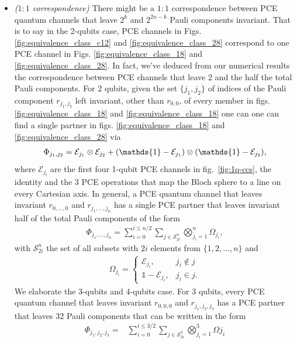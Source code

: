 \documentclass[11pt,dvipsnames]{article} %
\newcommand{\fref}[1]{fig.~\ref{#1}}
\newcommand{\E}{\mathcal{E}}
\newcommand{\1}{\mathds{1}}
\newcommand{\ot}{\otimes}
\begin{document}
\begin{itemize}
\item \textit{($1:1$ correspondence)} There might be a 
$1:1$ correspondence between PCE quantum channels
that leave $2^k$ and $2^{2n-k}$ Pauli components invariant. 
That is to say in the 2-qubits case, 
PCE channels in Figs. \ref{fig:equivalence_class_c12}
and \ref{fig:equivalence_class_28} correspond to one 
PCE channel in Figs. \ref{fig:equivalence_class_18} and
\ref{fig:equivalence_class_28}. In fact, we've deduced from 
our numerical results the correspondence between PCE channels 
that leave 2 and the half the total Pauli components. For 2 qubits,
given the set $\{j_1,j_2 \}$ of indices of the Pauli component $r_{j_1,j_2}$ left
invariant, other than $r_{0,0}$, of every member in figs.
\ref{fig:equivalence_class_18} and \ref{fig:equivalence_class_18} one 
can one can find a single partner in figs. \ref{fig:equivalence_class_18} and
\ref{fig:equivalence_class_28} via
\begin{align}
\Phi_{j_1,j_2}=\E_{j_1}\ot\E_{j_2}+\qty(\1-\E_{j_1})\ot\qty(\1-\E_{j_2}),
\end{align}
where $\E_{j_l}$ are the first four 1-qubit PCE channels in 
\fref{fig:1q-ccs}, the identity and the 3 PCE operations that 
map the Bloch sphere to a line on every Cartesian axis. In general, 
a PCE quantum channel that leaves invariant $r_{0,\ldots,0}$ and 
$r_{j_1,\ldots,j_n}$ has a single PCE partner that leaves invariant 
half of the total Pauli components of the form 
\begin{align}
\Phi_{j_1,\ldots,j_n}=\sum_{i=0}^{i\leq n/2}\sum_{j\in \mathcal{S}_{2i}^n}
\bigotimes_{j_i=1}^n\Omega_{j_i},
\end{align}
with $\mathcal{S}_{2i}^n$ the set of all subsets with $2i$ elements 
from $\{1,2,\ldots,n\}$ and
\begin{align}
\Omega_{j_i}= \left\{ \begin{array}{rc}
             \E_{j_i}, & j_i \notin j \\
             \1 -\E_{j_i}, & j_i \in j.
             \end{array}
   \right.
\end{align}
We elaborate the 3-qubits and 4-qubits case. For 3 qubits, 
every PCE quantum channel that leaves invariant $r_{0,0,0}$ and 
$r_{j_1,j_2,j_3}$ has a PCE partner that leaves 32 Pauli components 
that can be written in the form
\begin{align}
\Phi_{j_1,j_2,j_3}=& \sum_{i=0}^{i\leq 3/2}
\sum_{j\in \mathcal{S}_{2i}^3}
\bigotimes_{j_i=1}^3\Omega{j_i} \nonumber \\

\end{align}
\end{itemize}
\end{document}
